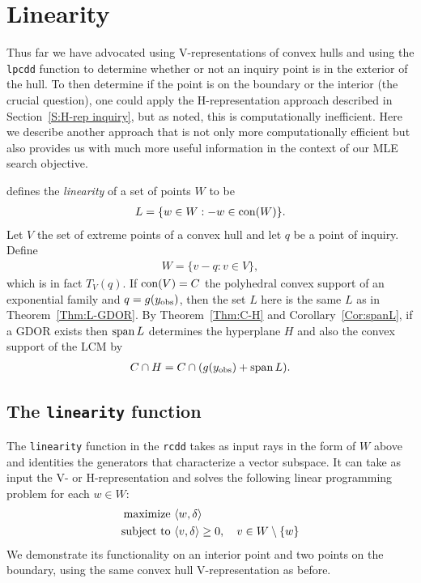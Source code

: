 \section{Linearity}\label{S:linearity}
Thus far we have advocated using V-representations of convex hulls and using
the \texttt{lpcdd} function to determine whether or not an inquiry point is
in the exterior of the hull.  To then determine if the point is on the boundary
or the interior (the crucial question), one could apply the 
H-representation approach described in 
Section~\ref{S:H-rep inquiry}, but as noted, this is computationally inefficient.
Here we describe another approach that is not only more computationally efficient
but also provides us with much more useful information in the context of our
MLE search objective.

\citet{Geyer:gdor} defines the \emph{linearity} of a set of points $W$ to be
\begin{align*}
	L = \{ w \in W: -w \in \operatorname{con}( W ) \}.
\end{align*}
Let $V$ the set of extreme points of a convex hull and let $q$ be a point of inquiry.
Define 
\begin{align*}
W = \{ v - q: v \in V \},
\end{align*}
which is in fact $T_V(q)$.  If $\operatorname{con}( V ) = C$ the
polyhedral convex support of an exponential family and $q = g(y_{\text{obs}})$, then the set 
$L$ here is the same $L$ as in Theorem~\ref{Thm:L-GDOR}.    
By Theorem~\ref{Thm:C-H} and Corollary~\ref{Cor:spanL}, if a GDOR 
exists then $\operatorname{span} L$  
determines the hyperplane $H$ and also the convex support of the LCM by
\begin{align*}
	C \cap H = C \cap (g(y_{\text{obs}}) + \operatorname{span} L).
\end{align*}

\subsection{The \texttt{linearity} function}
The \texttt{linearity} function in the \texttt{rcdd} takes as input rays in 
the form of $W$ above and identities the generators that characterize
a vector subspace.  It can take as input the V- or H-representation and solves the 
following linear programming problem for each $w \in W$:
\begin{align*}
	\text{maximize } 	&\langle w,\delta \rangle\\
	\text{subject to } 	&\langle v,\delta \rangle \geq 0, \quad v \in W \setminus \{w\}
\end{align*}
We demonstrate its functionality on an interior
point and two points on the boundary, using the same convex hull V-representation
as before.

